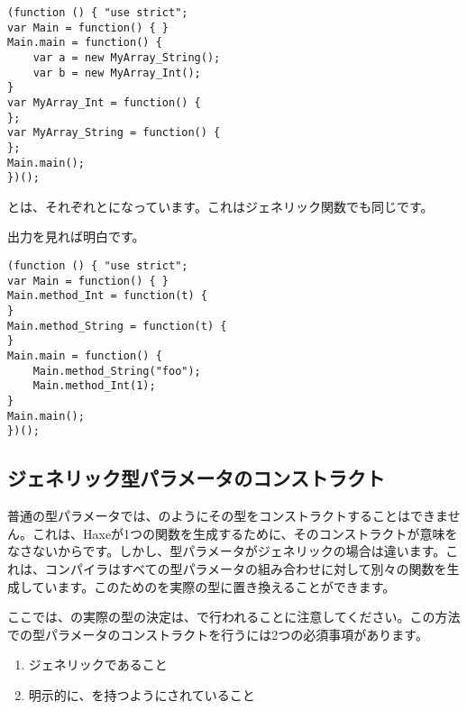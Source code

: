 \begin{lstlisting}
(function () { "use strict";
var Main = function() { }
Main.main = function() {
	var a = new MyArray_String();
	var b = new MyArray_Int();
}
var MyArray_Int = function() {
};
var MyArray_String = function() {
};
Main.main();
})();
\end{lstlisting}

とは、それぞれとになっています。これはジェネリック関数でも同じです。


出力を見れば明白です。

\begin{lstlisting}
(function () { "use strict";
var Main = function() { }
Main.method_Int = function(t) {
}
Main.method_String = function(t) {
}
Main.main = function() {
	Main.method_String("foo");
	Main.method_Int(1);
}
Main.main();
})();
\end{lstlisting}


\subsection{ジェネリック型パラメータのコンストラクト}
\label{type-system-generic-type-parameter-construction}


普通の型パラメータでは、のようにその型をコンストラクトすることはできません。これは、Haxeが1つの関数を生成するために、そのコンストラクトが意味をなさないからです。しかし、型パラメータがジェネリックの場合は違います。これは、コンパイラはすべての型パラメータの組み合わせに対して別々の関数を生成しています。このためのを実際の型に置き換えることができます。


ここでは、の実際の型の決定は、で行われることに注意してください。この方法での型パラメータのコンストラクトを行うには2つの必須事項があります。

\begin{enumerate}
	\item ジェネリックであること
	\item 明示的に、を持つようにされていること
\end{enumerate}

